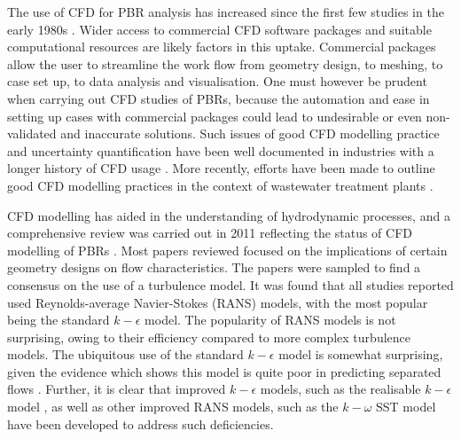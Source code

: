 \skippingparagraph
The use of CFD for PBR analysis has increased since the first few studies in the early 1980s \cite{patankar1980}. Wider access to commercial CFD software packages and suitable computational resources are likely factors in this uptake. Commercial packages allow the user to streamline the work flow from geometry design, to meshing, to case set up, to data analysis and visualisation. One must however be prudent when carrying out CFD studies of PBRs, because the automation and ease in setting up cases with commercial packages could lead to undesirable or even non-validated and inaccurate solutions. Such issues of good CFD modelling practice and uncertainty quantification have been well documented in industries with a longer history of CFD usage \cite{roache2002,oberkampf2002,celik2008,pelletier2010}.  More recently, efforts have been made to outline good CFD modelling practices in the context of wastewater treatment plants \cite{wicklein2016}.
\skippingparagraph

CFD modelling has aided in the understanding of hydrodynamic processes, and a comprehensive review was carried out in 2011 reflecting the status of CFD modelling of PBRs \cite{bitog2011}. Most papers reviewed focused on the implications of certain geometry designs on flow characteristics. The papers were sampled to find a consensus on the use of a turbulence model. It was found that all studies reported used Reynolds-average Navier-Stokes (RANS) models, with the most popular being the standard $k-\epsilon$ model. The popularity of RANS models is not surprising, owing to their efficiency compared to more complex turbulence models.  The ubiquitous use of the standard $k-\epsilon$ model is somewhat surprising, given the evidence which shows this model is quite poor in predicting separated flows \cite{menter2003}. Further, it is clear that improved $k-\epsilon$ models, such as the realisable $k-\epsilon$ model \cite{shih1995}, as well as other improved RANS models, such as the $k-\omega$  SST model \cite{menter1994,menter2003} have been developed to address such deficiencies.
\skippingparagraph


